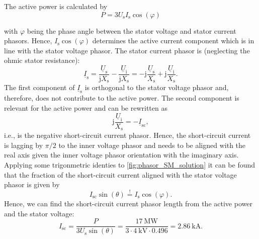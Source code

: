 \begin{solutionblock}
    The active power is calculated by
    $$ P = 3 U_\mathrm{s} I_\mathrm{s} \cos(\varphi)$$

    with $\varphi$ being the phase angle between the stator voltage and stator current phasors. Hence, $I_\mathrm{s} \cos(\varphi)$ determines the active current component which is in line with the stator voltage phasor. The stator current phasor is (neglecting the ohmic stator resistance):
    $$
     \underline{I}_\mathrm{s} = \frac{\underline{U}_\mathrm{s}}{\mathrm{j}X_\mathrm{s}} - \frac{\underline{U}_\mathrm{i}}{\mathrm{j}X_\mathrm{s}}= -\mathrm{j}\frac{\underline{U}_\mathrm{s}}{X_\mathrm{s}} + \mathrm{j}\frac{\underline{U}_\mathrm{i}}{X_\mathrm{s}}.
    $$
    The first component of $\underline{I}_\mathrm{s}$ is orthogonal to the stator voltage phasor and, therefore, does not contribute to the active power. The second component is relevant for the active power and can be rewritten as
    $$ \mathrm{j}\frac{\underline{U}_\mathrm{i}}{X_\mathrm{s}} = -\underline{I}_\mathrm{sc},
    $$
    i.e., is the negative short-circuit current phasor. Hence, the short-circuit current is lagging by $\pi/2$ to the inner voltage phasor and needs to be aligned with the real axis given the inner voltage phasor orientation with the imaginary axis. Applying some trigonmetric identies to \autoref{fig:phasor_SM_solution} it can be found that the fraction of the short-circuit current aligned with the stator voltage phasor is given by
    $$I_\mathrm{sc}\sin(\theta)\stackrel{!}{=}I_\mathrm{s} \cos(\varphi).$$
    Hence, we can find the short-circuit current phasor length from the active power and the stator voltage:
    $$
    I_\mathrm{sc} = \frac{P}{3 U_\mathrm{s} \sin(\theta)} = \frac{\SI{17}{\mega\watt}}{3\cdot \SI{4}{\kilo\volt} \cdot0.496} = \SI{2.86}{\kilo\ampere}.
    $$


\end{solutionblock}
